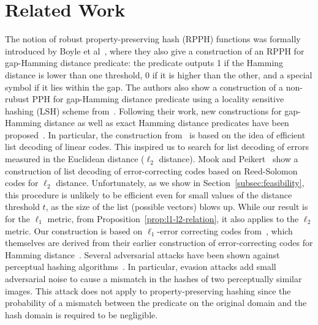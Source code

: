 \documentclass[pdflatex,sn-mathphys-num]{sn-jnl}
\theoremstyle{definition}
\begin{document}
\section{Related Work}
\label{sec:rw}
The notion of robust property-preserving hash (RPPH) functions was formally introduced by Boyle et al~\cite{boyle2018adversarially}, where they also give a construction of an RPPH for gap-Hamming distance predicate: the predicate outputs 1 if the Hamming distance is lower than one threshold, 0 if it is higher than the other, and a special symbol if it lies within the gap. The authors also show a construction of a non-rubust PPH for gap-Hamming distance predicate using a locality sensitive hashing (LSH) scheme from~\cite{kushilevitz1998efficient}. Following their work, new constructions for gap-Hamming distance as well as exact Hamming distance predicates have been proposed~\cite{holmgren2022nearly, fleischhacker2021robust, fleischhacker2022property}. In particular, the construction from~\cite{holmgren2022nearly} is based on the idea of efficient list decoding of linear codes. This inspired us to search for list decoding of errors measured in the Euclidean distance ($\ell_2$ distance). Mook and Peikert~\cite{mook2021lattice} show a construction of list decoding of error-correcting codes based on Reed-Solomon codes for $\ell_2$ distance. Unfortunately, as we show in Section~\ref{subsec:feasibility}, this procedure is unlikely to be efficient even for small values of the distance threshold $t$, as the size of the list (possible vectors) blows up. While our result is for the $\ell_1$ metric, from Proposition~\ref{prop:l1-l2-relation}, it also applies to the $\ell_2$ metric. Our construction is based on $\ell_1$-error correcting codes from~\cite{tallinil1codes}, which themselves are derived from their earlier construction of error-correcting codes for Hamming distance~\cite{tallinihammingcodes}. Several adversarial attacks have been shown against perceptual hashing algorithms~\cite{struppek2022neuralhashbreak, hao2021pph-attack}. In particular, evasion attacks add small adversarial noise to cause a mismatch in the hashes of two perceptually similar images. This attack does not apply to property-preserving hashing since the probability of a mismatch between the predicate on the original domain and the hash domain is required to be negligible.   

\end{document}
